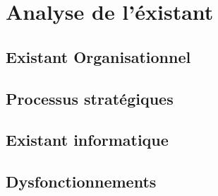 \chapter{Analyse de l’\'existant}

\section{Existant Organisationnel}

\section{Processus strat\'egiques}

\section{Existant informatique}

\section{Dysfonctionnements}

